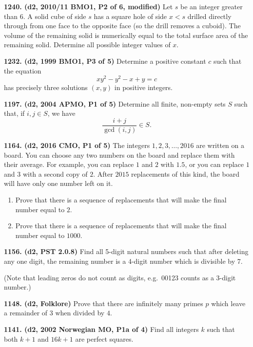 \documentclass{article}
\begin{document}
\textbf{1240. (\color{red}d2\color{black}, 2010/11 BMO1, P2 of 6, modified)} Let $s$ be an integer greater than $6$. A solid cube of side $s$ has a square hole of side $x < s$ drilled directly through from one face to the opposite face (so the drill removes a cuboid). The volume of the remaining solid is numerically equal to the total surface area of the remaining solid. Determine all possible integer values of $x$.

\textbf{1232. (\color{red}d2\color{black}, 1999 BMO1, P3 of 5)} Determine a positive constant $c$ such that the equation \begin{equation*}xy^2 - y^2 - x + y = c\end{equation*} has precisely three solutions $(x, y)$ in positive integers.

\textbf{1197. (\color{red}d2\color{black}, 2004 APMO, P1 of 5)} Determine all finite, non-empty sets $S$ such that, if $i, j \in S$, we have \begin{equation*}\frac{i+j}{\gcd(i, j)} \in S.\end{equation*}

\textbf{1164. (\color{red}d2\color{black}, 2016 CMO, P1 of 5)} The integers \(1, 2, 3, \ldots , 2016\) are written on a board. You can choose any two numbers on the board and replace them with their average. For example, you can replace \(1\) and \(2\) with \(1.5\), or you can replace \(1\) and \(3\) with a second copy of \(2\). After \(2015\) replacements of this kind, the board will have only one number left on it.
\begin{enumerate}
    \item Prove that there is a sequence of replacements that will make the final number equal to \(2\).
    \item Prove that there is a sequence of replacements that will make the final number equal to \(1000\).
\end{enumerate}

\textbf{1156. (\color{red}d2\color{black}, PST 2.0.8)} Find all 5-digit natural numbers such that after deleting any one digit, the remaining number is a 4-digit number which is divisible by 7.

(Note that leading zeros do not count as digits, e.g.\ 00123 counts as a 3-digit number.)

\textbf{1148. (\color{red}d2\color{black}, Folklore)} Prove that there are infinitely many primes $p$ which leave a remainder of $3$ when divided by $4$.

\textbf{1141. (\color{red}d2\color{black}, 2002 Norwegian MO, P1a of 4)} Find all integers $k$ such that both $k + 1$ and $16k + 1$ are perfect squares.
\end{document}
